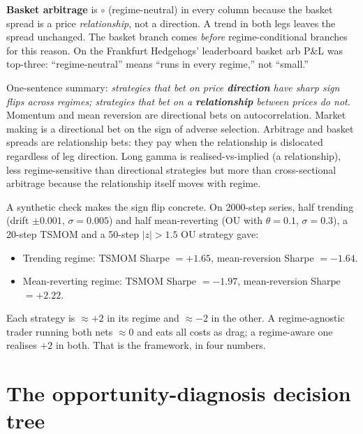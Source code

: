 \textbf{Basket arbitrage} is $\circ$ (regime-neutral) in every
column because the basket spread is a price \emph{relationship},
not a direction. A trend in both legs leaves the spread unchanged.
The basket branch comes \emph{before} regime-conditional branches
for this reason. On the Frankfurt Hedgehogs' leaderboard basket arb
P\&L was top-three: ``regime-neutral'' means ``runs in every
regime,'' not ``small.''

\begin{intuitionbox}
One-sentence summary: \emph{strategies that bet on price
\textbf{direction} have sharp sign flips across regimes;
strategies that bet on a \textbf{relationship} between prices do
not}. Momentum and mean reversion are directional bets on
autocorrelation. Market making is a directional bet on the sign of
adverse selection. Arbitrage and basket spreads are relationship
bets: they pay when the relationship is dislocated regardless
of leg direction. Long gamma is realised-vs-implied (a
relationship), less regime-sensitive than directional strategies
but more than cross-sectional arbitrage because the relationship
itself moves with regime.
\end{intuitionbox}

A synthetic check makes the sign flip concrete. On 2000-step
series, half trending (drift $\pm 0.001$, $\sigma = 0.005$) and
half mean-reverting (OU with $\theta = 0.1$, $\sigma = 0.3$), a
20-step TSMOM and a 50-step $|z|>1.5$ OU strategy gave:
\begin{itemize}
  \item Trending regime: TSMOM Sharpe $= +1.65$,
  mean-reversion Sharpe $= -1.64$.
  \item Mean-reverting regime: TSMOM Sharpe $= -1.97$,
  mean-reversion Sharpe $= +2.22$.
\end{itemize}
Each strategy is $\approx +2$ in its regime and $\approx -2$ in
the other. A regime-agnostic trader running both nets $\approx 0$
and eats all costs as drag; a regime-aware one realises $+2$ in
both. That is the framework, in four numbers.

\section{The opportunity-diagnosis decision tree}
\label{sec:wsw_decision_tree}

